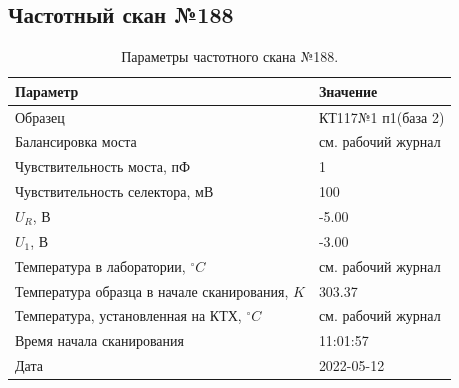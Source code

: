 \subsection{Частотный скан №188}
\begin{table}[!ht]
    \centering
    \caption{Параметры частотного скана №188.}
    \begin{tabular}{|l|l|}
        \hline
        Параметр                                       & Значение                  \\ \hline
        Образец                                        & КТ117№1 п1(база 2)        \\ \hline
        Балансировка моста                             & см. рабочий журнал        \\ \hline
        Чувствительность моста, пФ                     & 1                         \\ \hline
        Чувствительность селектора, мВ                 & 100                       \\ \hline
        $U_R$, В                                       & -5.00                     \\ \hline
        $U_1$, В                                       & -3.00                     \\ \hline
        Температура в лаборатории, $^\circ C$          & см. рабочий журнал        \\ \hline
        Температура образца в начале сканирования, $K$ & 303.37                    \\ \hline
        Температура, установленная на КТХ, $^\circ C$  & см. рабочий журнал        \\ \hline
        Время начала сканирования                      & 11:01:57                  \\ \hline
        Дата                                           & 2022-05-12                \\ \hline
    \end{tabular}
    \label{table:frequency_scan_188}
\end{table}

